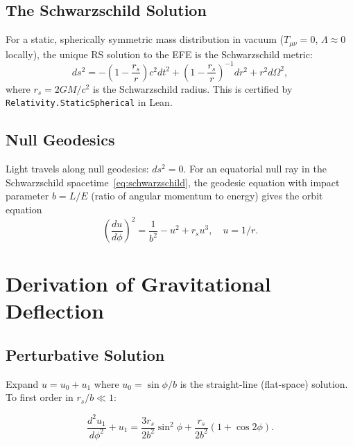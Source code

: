 \documentclass[12pt,a4paper]{article}
\theoremstyle{definition}
\theoremstyle{remark}
\begin{document}
\subsection{The Schwarzschild Solution}

For a static, spherically symmetric mass distribution in vacuum
($T_{\mu\nu} = 0$, $\Lambda \approx 0$ locally), the unique RS solution
to the EFE is the Schwarzschild metric:
\begin{equation}
  ds^2 = -\left(1 - \frac{r_s}{r}\right)c^2 dt^2
         + \left(1 - \frac{r_s}{r}\right)^{-1}dr^2
         + r^2 d\Omega^2,
  \label{eq:schwarzschild}
\end{equation}
where $r_s = 2GM/c^2$ is the Schwarzschild radius.  This is certified
by \texttt{Relativity.StaticSpherical} in Lean.

\subsection{Null Geodesics}

Light travels along null geodesics: $ds^2 = 0$.  For an equatorial
null ray in the Schwarzschild spacetime~\eqref{eq:schwarzschild}, the
geodesic equation with impact parameter $b = L/E$ (ratio of angular
momentum to energy) gives the orbit equation
\begin{equation}
  \left(\frac{du}{d\phi}\right)^2 = \frac{1}{b^2} - u^2 + r_s u^3,
  \quad u = 1/r.
  \label{eq:null_geo}
\end{equation}

\section{Derivation of Gravitational Deflection}
\label{sec:deflection}

\subsection{Perturbative Solution}

Expand $u = u_0 + u_1$ where $u_0 = \sin\phi/b$ is the straight-line
(flat-space) solution.  To first order in $r_s/b \ll 1$:

\begin{equation}
  \frac{d^2 u_1}{d\phi^2} + u_1 = \frac{3r_s}{2b^2}\sin^2\phi
  + \frac{r_s}{2b^2}(1 + \cos 2\phi).
\end{equation}
\end{document}
